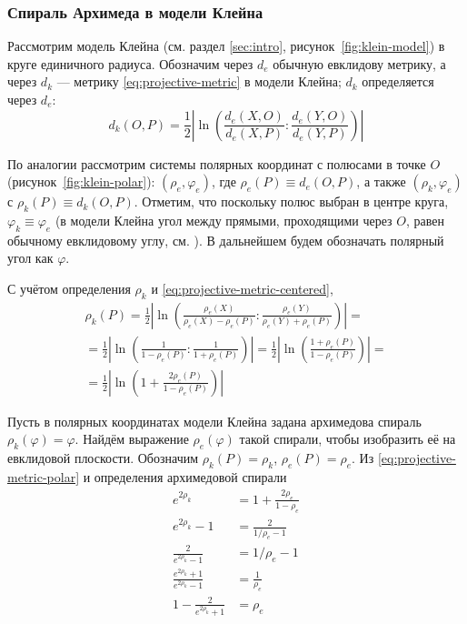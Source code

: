 \documentclass{article}
\numberwithin{equation}{section}
\renewcommand{\phi}{\varphi}
\providecommand{\abs}[1]{\left \lvert{#1}\right \rvert}
\begin{document}
\subsubsection{Спираль Архимеда в модели Клейна}
\label{sec:arch-spiral-klein}

Рассмотрим модель Клейна (см. раздел \ref{sec:intro},
рисунок \ref{fig:klein-model}) в круге единичного радиуса. Обозначим
через $d_e$ обычную евклидову метрику, а через $d_k$ — метрику
\eqref{eq:projective-metric} в модели Клейна; $d_k$ определяется через
$d_e$:
\begin{equation}\label{eq:projective-metric-centered}
  d_k(O,P) = \frac{1}{2}\abs{\ln\left(\frac{d_e(X,O)}{d_e(X,P)}:\frac{d_e(Y,O)}{d_e(Y,P)}\right)}
\end{equation}

По аналогии рассмотрим системы полярных координат с полюсами в точке
$O$ (рисунок \ref{fig:klein-polar}): $(\rho_e, \phi_e)$, где
$\rho_e(P) \equiv d_e(O,P)$, а также $(\rho_k, \phi_e)$ с $\rho_k(P)
\equiv d_k(O, P)$. Отметим, что поскольку полюс выбран в центре круга,
$\phi_k \equiv \phi_e$ (в модели Клейна угол между прямыми,
проходящими через $O$, равен обычному евклидовому углу, см.
\cite{zaslavsky04}). В дальнейшем будем обозначать полярный угол как
$\phi$.



С учётом определения $\rho_k$ и \eqref{eq:projective-metric-centered},
\begin{multline}\label{eq:projective-metric-polar}
  \rho_k(P) =
  \frac{1}{2}\abs{\ln\left(\frac{\rho_e(X)}{\rho_e(X)-\rho_e(P)}:\frac{\rho_e(Y)}{\rho_e(Y)+\rho_e(P)}\right)}  = \\
  =\frac{1}{2}\abs{\ln\left(\frac{1}{1-\rho_e(P)}:\frac{1}{1+\rho_e(P)}\right)} =
  \frac{1}{2}\abs{\ln\left(\frac{1+\rho_e(P)}{1-\rho_e(P)}\right)} =\\
  = \frac{1}{2}\abs{\ln\left(1+\frac{2\rho_e(P)}{1-\rho_e(P)}\right)}
\end{multline}

Пусть в полярных координатах модели Клейна задана архимедова спираль
$\rho_k(\phi) = \phi$. Найдём выражение $\rho_e(\phi)$ такой спирали,
чтобы изобразить её на евклидовой плоскости. Обозначим $\rho_k(P) =
\rho_k$, $\rho_e(P) = \rho_e$. Из \eqref{eq:projective-metric-polar} и
определения архимедовой спирали
\begin{equation*}
  \begin{split}
    e^{2\rho_k} &= 1+\frac{2\rho_e}{1-\rho_e} \\
    e^{2\rho_k}-1 &= \frac{2}{1/\rho_e-1} \\
    \frac{2}{e^{2\rho_k}-1} &=1/\rho_e-1 \\
    \frac{e^{2\rho_k}+1}{e^{2\rho_k}-1} &= \frac{1}{\rho_e} \\
    1-\frac{2}{e^{2\rho_k}+1} &= \rho_e
  \end{split}
\end{equation*}
\end{document}
